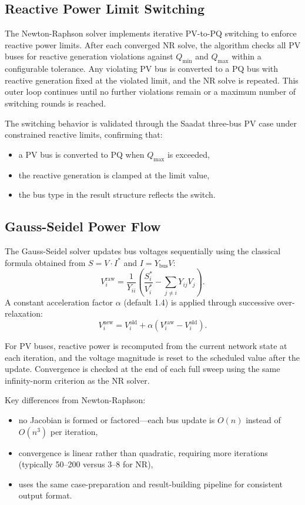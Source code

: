 \documentclass[12pt,a4paper]{article}
\begin{document}
\subsection{Reactive Power Limit Switching}

The Newton-Raphson solver implements iterative PV-to-PQ switching to enforce reactive power limits. After each converged NR solve, the algorithm checks all PV buses for reactive generation violations against \(Q_{\min}\) and \(Q_{\max}\) within a configurable tolerance. Any violating PV bus is converted to a PQ bus with reactive generation fixed at the violated limit, and the NR solve is repeated. This outer loop continues until no further violations remain or a maximum number of switching rounds is reached.

The switching behavior is validated through the Saadat three-bus PV case under constrained reactive limits, confirming that:
\begin{itemize}[leftmargin=1.5em]
    \item a PV bus is converted to PQ when $Q_{\max}$ is exceeded,
    \item the reactive generation is clamped at the limit value,
    \item the bus type in the result structure reflects the switch.
\end{itemize}

\subsection{Gauss-Seidel Power Flow}

The Gauss-Seidel solver updates bus voltages sequentially using the classical formula obtained from \(S = V \cdot I^*\) and \(I = Y_{\text{bus}}V\):
\[
V_i^{\text{raw}} = \frac{1}{Y_{ii}} \left( \frac{S_i^*}{V_i^*} - \sum_{j \ne i} Y_{ij} V_j \right).
\]
A constant acceleration factor \(\alpha\) (default 1.4) is applied through successive over-relaxation:
\[
V_i^{\text{new}} = V_i^{\text{old}} + \alpha \left( V_i^{\text{raw}} - V_i^{\text{old}} \right).
\]

For PV buses, reactive power is recomputed from the current network state at each iteration, and the voltage magnitude is reset to the scheduled value after the update. Convergence is checked at the end of each full sweep using the same infinity-norm criterion as the NR solver.

Key differences from Newton-Raphson:
\begin{itemize}[leftmargin=1.5em]
    \item no Jacobian is formed or factored---each bus update is $O(n)$ instead of $O(n^3)$ per iteration,
    \item convergence is linear rather than quadratic, requiring more iterations (typically 50--200 versus 3--8 for NR),
    \item uses the same case-preparation and result-building pipeline for consistent output format.
\end{itemize}
\end{document}
